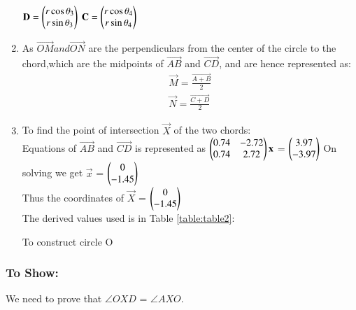 \begin{enumerate}[label=\thesection.\arabic*.,ref=\thesection.\theenumi]
  \quad $ \mathbf{D}= \begin{pmatrix}r\cos{\theta _3}\\r\sin{\theta _3}\end{pmatrix}$
  \quad $\mathbf{C}=\begin{pmatrix}r\cos{\theta _4 }\\r\sin{\theta _4}\end{pmatrix}$

\item As $\vec{OM} and \vec{ON}$ are the perpendiculars from the center of the circle to the chord,which are the midpoints of $\vec{AB}$ and $\vec{CD}$, and are hence represented as:\\
\begin{align}
 \vec{M} = \frac{\vec{A+B}}{2}\\
  \vec{N} = \frac{\vec{C+D}}{2} 
\end{align}

\item To find the point of intersection $\vec{X}$ of the two chords:\\
Equations of $\vec{AB}$ and $\vec{CD}$ is represented as
$\begin{pmatrix}0.74&-2.72\\0.74&2.72\end{pmatrix}\mathbf{x}$   = $\begin{pmatrix}3.97\\-3.97\end{pmatrix}$
On solving we get $\vec{x}$ = $\begin{pmatrix}0\\-1.45\end{pmatrix}$\\
Thus the coordinates of $\vec{X}$ = $\begin{pmatrix}0\\-1.45\end{pmatrix}$\\
The derived values used is in Table \ref{table:table2}:
\begin{table}[ht]
    \begin{center}
    	
  \caption{To construct circle O}
   \label{table:table2}
   \end{center}	
\end{table}


\end{enumerate}

\subsubsection*{To Show:}    We need to prove that $\angle{OXD}$ = $\angle{AXO}$.\\
